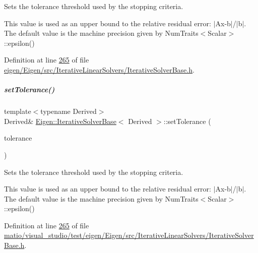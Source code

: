 Sets the tolerance threshold used by the stopping criteria.

This value is used as an upper bound to the relative residual error\+: $\vert$\+Ax-\/b$\vert$/$\vert$b$\vert$. The default value is the machine precision given by Num\+Traits$<$\+Scalar$>$\+::epsilon() 

Definition at line \hyperlink{eigen_2_eigen_2src_2_iterative_linear_solvers_2_iterative_solver_base_8h_source_l00265}{265} of file \hyperlink{eigen_2_eigen_2src_2_iterative_linear_solvers_2_iterative_solver_base_8h_source}{eigen/\+Eigen/src/\+Iterative\+Linear\+Solvers/\+Iterative\+Solver\+Base.\+h}.

\mbox{\label{group___iterative_linear_solvers___module_ac160a444af8998f93da9aa30e858470d}} 
\subparagraph{\texorpdfstring{set\+Tolerance()}{setTolerance()}\hspace{0.1cm}{\footnotesize\ttfamily [2/2]}}
{\footnotesize\ttfamily template$<$typename Derived$>$ \\
Derived\& \hyperlink{group___iterative_linear_solvers___module_class_eigen_1_1_iterative_solver_base}{Eigen\+::\+Iterative\+Solver\+Base}$<$ Derived $>$\+::set\+Tolerance (\begin{DoxyParamCaption}\item[{const Real\+Scalar \&}]{tolerance }\end{DoxyParamCaption})\hspace{0.3cm}{\ttfamily [inline]}}

Sets the tolerance threshold used by the stopping criteria.

This value is used as an upper bound to the relative residual error\+: $\vert$\+Ax-\/b$\vert$/$\vert$b$\vert$. The default value is the machine precision given by Num\+Traits$<$\+Scalar$>$\+::epsilon() 

Definition at line \hyperlink{matio_2visual__studio_2test_2eigen_2_eigen_2src_2_iterative_linear_solvers_2_iterative_solver_base_8h_source_l00265}{265} of file \hyperlink{matio_2visual__studio_2test_2eigen_2_eigen_2src_2_iterative_linear_solvers_2_iterative_solver_base_8h_source}{matio/visual\+\_\+studio/test/eigen/\+Eigen/src/\+Iterative\+Linear\+Solvers/\+Iterative\+Solver\+Base.\+h}.

